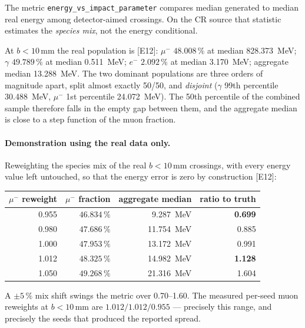 \documentclass[11pt,a4paper]{article}
\newcommand{\ev}[1]{{\footnotesize\textcolor{prov}{[#1]}}}
\begin{document}
The metric \texttt{energy\_vs\_impact\_parameter} compares median generated to
median real energy among detector-aimed crossings. On the CR source that
statistic estimates the \emph{species mix}, not the energy conditional.

At $b<10$\,mm the real population is \ev{E12}: $\mu^{-}$ $48.008\,\%$ at median
\SI{828.373}{\mega\electronvolt}; $\gamma$ $49.789\,\%$ at median
\SI{0.511}{\mega\electronvolt}; $e^{-}$ $2.092\,\%$ at median
\SI{3.170}{\mega\electronvolt}; aggregate median
\SI{13.288}{\mega\electronvolt}. The two dominant populations are three orders
of magnitude apart, split almost exactly 50/50, and \emph{disjoint} ($\gamma$
99th percentile \SI{30.488}{\mega\electronvolt}, $\mu^{-}$ 1st percentile
\SI{24.072}{\mega\electronvolt}). The 50th percentile of the combined sample
therefore falls in the empty gap between them, and the aggregate median is
close to a step function of the muon fraction.

\paragraph{Demonstration using the real data only.} Reweighting the species mix
of the real $b<10$\,mm crossings, with every energy value left untouched, so
that the energy error is zero by construction \ev{E12}:

\begin{center}
\begin{tabular}{rrrr}
\toprule
$\mu^{-}$ reweight & $\mu^{-}$ fraction & aggregate median & ratio to truth \\
\midrule
0.955 & $46.834\,\%$ & \SI{9.287}{\mega\electronvolt}  & \textbf{0.699} \\
0.980 & $47.686\,\%$ & \SI{11.754}{\mega\electronvolt} & 0.885 \\
1.000 & $47.953\,\%$ & \SI{13.172}{\mega\electronvolt} & 0.991 \\
1.012 & $48.325\,\%$ & \SI{14.982}{\mega\electronvolt} & \textbf{1.128} \\
1.050 & $49.268\,\%$ & \SI{21.316}{\mega\electronvolt} & 1.604 \\
\bottomrule
\end{tabular}
\end{center}

A $\pm5\,\%$ mix shift swings the metric over 0.70--1.60. The measured per-seed
muon reweights at $b<10$\,mm are $1.012 / 1.012 / 0.955$ --- precisely this
range, and precisely the seeds that produced the reported spread.
\end{document}
